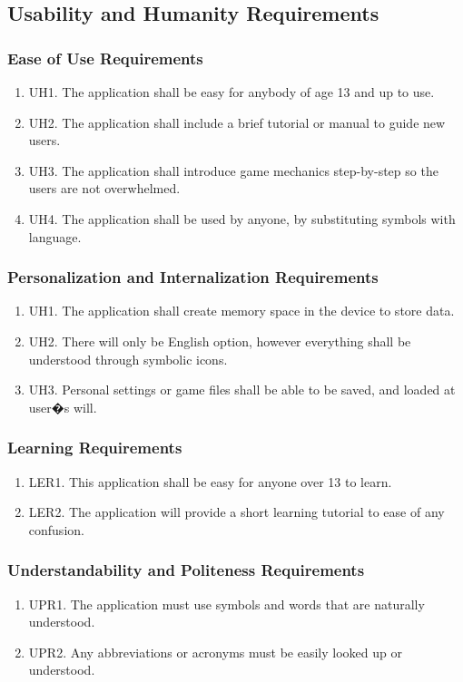 \documentclass[]{article}
\begin{document}
\subsection{Usability and Humanity Requirements}
\subsubsection{Ease of Use Requirements}
\begin{enumerate}
	\item UH1. The application shall be easy for anybody of age 13 and up to use.
	\item UH2. The application shall include a brief tutorial or manual to guide new users.
	\item UH3. The application shall introduce game mechanics step-by-step so the users are not overwhelmed.
	\item UH4. The application shall be used by anyone, by substituting symbols with language. 
\end{enumerate}

\subsubsection{Personalization and Internalization Requirements}
\begin{enumerate}
 \item UH1. The application shall create memory space in the device to store data.
 \item UH2. There will only be English option, however everything shall be understood through symbolic icons.
 \item UH3. Personal settings or game files shall be able to be saved, and loaded at user�s will.
\end{enumerate}

\subsubsection{Learning Requirements}
\begin{enumerate}
	\item LER1. This application shall be easy for anyone over 13 to learn.
	\item LER2. The application will provide a short learning tutorial to ease of any confusion.
\end{enumerate}

\subsubsection{Understandability and Politeness Requirements}
\begin{enumerate}
	\item UPR1. The application must use symbols and words that are naturally understood.
	\item UPR2. Any abbreviations or acronyms must be easily looked up or understood.
\end{enumerate}
\end{document}
